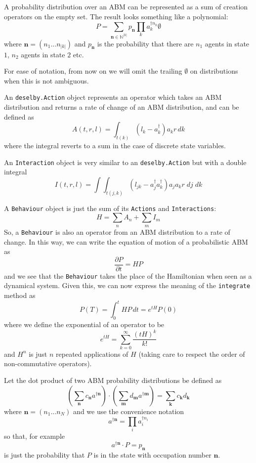\documentclass[letterpaper,twocolumn,10pt]{article}
\begin{document}
A probability distribution over an ABM can be represented as a sum of creation operators on the empty set. The result looks something like a polynomial:
\[
P = \sum_{\mathbf{n}\in \mathbb{N}^{|k|}} p_\mathbf{n} \prod_k a_k^{\dag n_k}\emptyset
\]
where $\mathbf{n} = (n_1...n_{|k|})$ and $p_\mathbf{n}$ is the probability that there are $n_1$ agents in state $1$, $n_2$ agents in state $2$ etc.

For ease of notation, from now on we will omit the trailing $\emptyset$ on distributions when this is not ambiguous.


An \texttt{deselby.Action} object represents an operator which takes an ABM distribution and returns a rate of change of an ABM distribution, and can be defined as
\[
A(t,r,l) = \int_{t(k)} (l_k - a_k^\dag)a_kr \,dk
\] 
where the integral reverts to a sum in the case of discrete state variables.

An \texttt{Interaction} object is very similar to an \texttt{deselby.Action} but with a double integral
\[
I(t,r,l) = \int \int_{t(j,k)} (l_{jk} - a_j^\dag a_k^\dag)a_j a_k r\;  dj\; dk
\] 

A \texttt{Behaviour} object is just the sum of its \texttt{Actions} and \texttt{Interactions}:
\[
H = \sum_n A_n + \sum_m I_m
\]
So, a \texttt{Behaviour} is also an operator from an ABM distribution to a rate of change. In this way, we can write the equation of motion of a probabilistic ABM as
\[
\frac{\partial P}{\partial t} = HP
\]
and we see that the \texttt{Behaviour} takes the place of the Hamiltonian when seen as a dynamical system. Given this, we can now express the meaning of the \texttt{integrate} method as
\begin{equation}
P(T) = \int_0^t HP \, dt = e^{tH}P(0)
\label{mastereq}
\end{equation}
where we define the exponential of an operator to be
\[
e^{tH} = \sum_{k=0}^\infty \frac{(tH)^k}{k!}
\]
and $H^n$ is just $n$ repeated applications of $H$ (taking care to respect the order of non-commutative operators).

Let the dot product of two ABM probability distributions be defined as
\[
\left(\sum_\mathbf{n} c_\mathbf{n} a^{\dag \mathbf{n}}\right) \cdot \left(\sum_\mathbf{m} d_\mathbf{m} a^{\dag \mathbf{m}}\right) = \sum_\mathbf{k} c_\mathbf{k}d_\mathbf{k}
\]
where $\mathbf{n} = (n_1...n_N)$ and we use the convenience notation
\[
a^{\dag \mathbf{n}} = \prod_i a_i^{\dag n_i}
\]
so that, for example
\[
a^{\dag \mathbf{n}} \cdot P = p_\mathbf{n}
\]
is just the probability that $P$ is in the state with occupation number $\mathbf{n}$.
\end{document}
